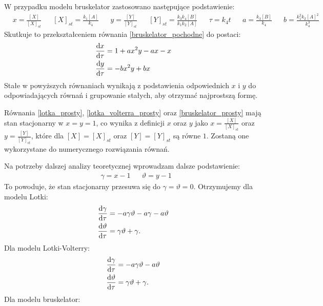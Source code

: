 \documentclass[10pt, a4paper, twoside, onecolumn]{article}
\numberwithin{equation}{section}
\begin{document}
	W przypadku modelu bruskelator zastosowano następujące podstawienie:
	\begin{align*}
		& x=\frac{[X]}{[X]_{st}} && [X]_{st} = \frac{k_{1}[A]}{k_{4}} && y=\frac{[Y]}{[Y]_{st}} && [Y]_{st} = \frac{k_{3}k_{4}[B]}{k_{1}k_{2}[A]} && \tau=k_{4}t && a=\frac{k_{3}[B]}{k_{4}} && b=\frac{k_{1}^{2}k_{2}[A]^{2}}{k_{4}^{3}}
	\end{align*}
	Skutkuje to przekształceniem równania \eqref{bruskelator_pochodne} do postaci: 
	\begin{equation}\label{bruskelator_prosty}
	\begin{split}
		\dv{x}{\tau} &= 1+ax^{2}y-ax-x \\
		\dv{y}{\tau} &= -bx^{2}y+bx
	\end{split}
	\end{equation}
	Stałe w powyższych równaniach wynikają z podstawienia odpowiednich \(x\) i \(y\) do odpowiadających równań i grupowanie stałych, aby otrzymać najprostszą formę. \par
	Równania \eqref{lotka_prosty}, \eqref{lotka_volterra_prosty} oraz \eqref{bruskelator_prosty} mają stan stacjonarny w \(x=y=1\), co wynika z definicji \(x\) oraz \(y\) jako \(x=\frac{[X]}{[X]_{st}}\) oraz \(y=\frac{[Y]}{[Y]_{st}}\), które dla \([X]=[X]_{st}\) oraz \([Y]=[Y]_{st}\) są równe \(1\). Zostaną one wykorzystane do numerycznego rozwiązania równań. \par
	Na potrzeby dalszej analizy teoretycznej wprowadzam dalsze podstawienie:
	\begin{align*}
		& \gamma=x-1 && \vartheta=y-1
	\end{align*}
	To powoduje, że stan stacjonarny przesuwa się do \(\gamma=\vartheta=0\). Otrzymujemy dla modelu Lotki:
	\begin{equation}\label{lotka_0}
	\begin{split}
		\dv{\gamma}{\tau} &= -a\gamma\vartheta-a\gamma-a\vartheta \\
		\dv{\vartheta}{\tau} &= \gamma\vartheta+\gamma.
	\end{split}
	\end{equation}
	Dla modelu Lotki-Volterry:
	\begin{equation}\label{lotka_volterra_0}
	\begin{split}
		\dv{\gamma}{\tau} &= -a\gamma\vartheta-a\vartheta \\
		\dv{\vartheta}{\tau} &= \gamma\vartheta+\gamma.
	\end{split}
	\end{equation}
	Dla modelu bruskelator:
\end{document}
